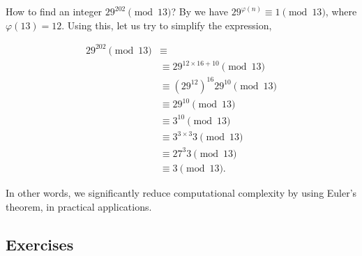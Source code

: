 \documentclass[../lecture-notes-148x210.tex]{subfiles}
\begin{document}
\begin{example}
    How to find an integer $29^{202} \pmod{13}$?
    By  we have $29^{\varphi(n)} \equiv 1 \pmod{13}$, where $\varphi(13) = 12$. 
    Using this, let us try to simplify the expression, 
 
    \begin{equation*}
        \begin{aligned}
            29^{202} \pmod{13}  &\equiv \\
                                &\equiv 29^{12 \times 16 + 10} \pmod{13} \\
                                &\equiv (29^{12})^{16} 29^{10} \pmod{13} \\
                                &\equiv 29^{10} \pmod{13} \\
                                &\equiv 3^{10} \pmod{13} \\
                                &\equiv 3^{3 \times 3} 3 \pmod{13} \\
                                &\equiv 27^{3}3 \pmod{13} \\
                                &\equiv 3 \pmod{13}.
        \end{aligned}
    \end{equation*}

    In other words, we significantly reduce computational complexity by using Euler's theorem,
    in practical applications.
\end{example}

\subsection{Exercises}
\end{document}
